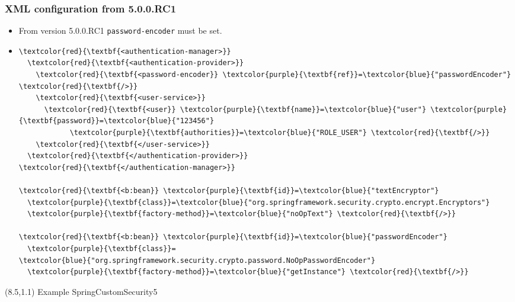 \documentclass[10pt,xcolor=pdflatex, table]{beamer}
\begin{document}
\begin{frame}[fragile]\frametitle{XML configuration from 5.0.0.RC1}
	\begin{itemize}
		\item From version 5.0.0.RC1 \texttt{password-encoder} must be set.
        \item[]
        	\medskip
            \begin{Verbatim}[fontsize=\footnotesize, commandchars=\\\{\}]
\textcolor{red}{\textbf{<authentication-manager>}}
  \textcolor{red}{\textbf{<authentication-provider>}}
    \textcolor{red}{\textbf{<password-encoder}} \textcolor{purple}{\textbf{ref}}=\textcolor{blue}{"passwordEncoder"} \textcolor{red}{\textbf{/>}}
    \textcolor{red}{\textbf{<user-service>}}
      \textcolor{red}{\textbf{<user}} \textcolor{purple}{\textbf{name}}=\textcolor{blue}{"user"} \textcolor{purple}{\textbf{password}}=\textcolor{blue}{"123456"}
            \textcolor{purple}{\textbf{authorities}}=\textcolor{blue}{"ROLE_USER"} \textcolor{red}{\textbf{/>}}
    \textcolor{red}{\textbf{</user-service>}}
  \textcolor{red}{\textbf{</authentication-provider>}}
\textcolor{red}{\textbf{</authentication-manager>}}

\textcolor{red}{\textbf{<b:bean}} \textcolor{purple}{\textbf{id}}=\textcolor{blue}{"textEncryptor"} 
  \textcolor{purple}{\textbf{class}}=\textcolor{blue}{"org.springframework.security.crypto.encrypt.Encryptors"}
  \textcolor{purple}{\textbf{factory-method}}=\textcolor{blue}{"noOpText"} \textcolor{red}{\textbf{/>}}
		
\textcolor{red}{\textbf{<b:bean}} \textcolor{purple}{\textbf{id}}=\textcolor{blue}{"passwordEncoder"} 
  \textcolor{purple}{\textbf{class}}=
\textcolor{blue}{"org.springframework.security.crypto.password.NoOpPasswordEncoder"}
  \textcolor{purple}{\textbf{factory-method}}=\textcolor{blue}{"getInstance"} \textcolor{red}{\textbf{/>}}
            \end{Verbatim}
	\end{itemize}
\begin{textblock}{15}(8.5,1.1)
    {\footnotesize Example SpringCustomSecurity5}
\end{textblock}
\end{frame}
\end{document}
